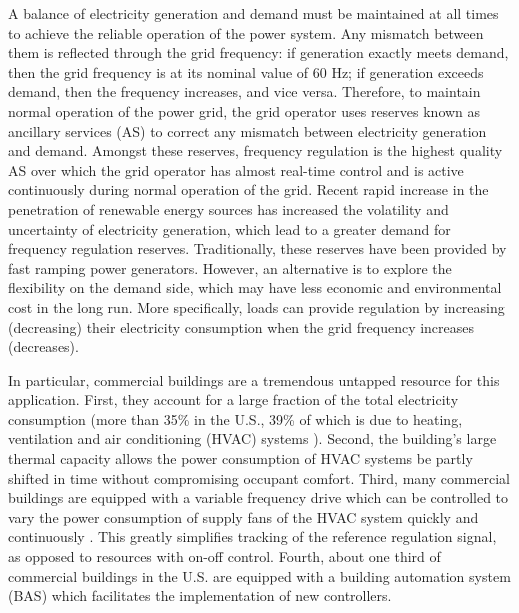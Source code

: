 \documentclass[../thesis.tex]{subfiles}
\begin{document}
A balance of electricity generation and demand must be maintained at all times to achieve the reliable operation of the power system.
Any mismatch between them is reflected through the grid frequency: if generation exactly meets demand, then the grid frequency is at its nominal value of 60 Hz; if generation exceeds demand, then the frequency increases, and vice versa.
Therefore, to maintain normal operation of the power grid, the grid operator uses reserves known as ancillary services (AS) to correct any mismatch between electricity generation and demand.
Amongst these reserves, frequency regulation is the highest quality AS over which the grid operator has almost real-time control and is active continuously during normal operation of the grid.
Recent rapid increase in the penetration of renewable energy sources has increased the volatility and uncertainty of electricity generation, which lead to a greater demand for frequency regulation reserves.
Traditionally, these reserves have been provided by fast ramping power generators.
However, an alternative is to explore the flexibility on the demand side, which may have less economic and environmental cost in the long run. 
More specifically, loads can provide regulation by increasing (decreasing) their electricity consumption when the grid frequency increases (decreases).

In particular, commercial buildings are a tremendous untapped resource for this application. 
First, they account for a large fraction of the total electricity consumption (more than 35\% in the U.S., 39\% of which is due to heating, ventilation and air conditioning (HVAC) systems \cite{USenergy:2017}). 
Second, the building's large thermal capacity allows the power consumption of HVAC systems be partly shifted in time without compromising occupant comfort. 
Third, many commercial buildings are equipped with a variable frequency drive which can be controlled to vary the power consumption of supply fans of the HVAC system quickly and continuously \cite{Hao:2012demandresponse}. This greatly simplifies tracking of the reference regulation signal, as opposed to resources with on-off control.
Fourth, about one third of commercial buildings in the U.S. are equipped with a building automation system (BAS) \cite{Braun:2012} which facilitates the implementation of new controllers.
\end{document}
